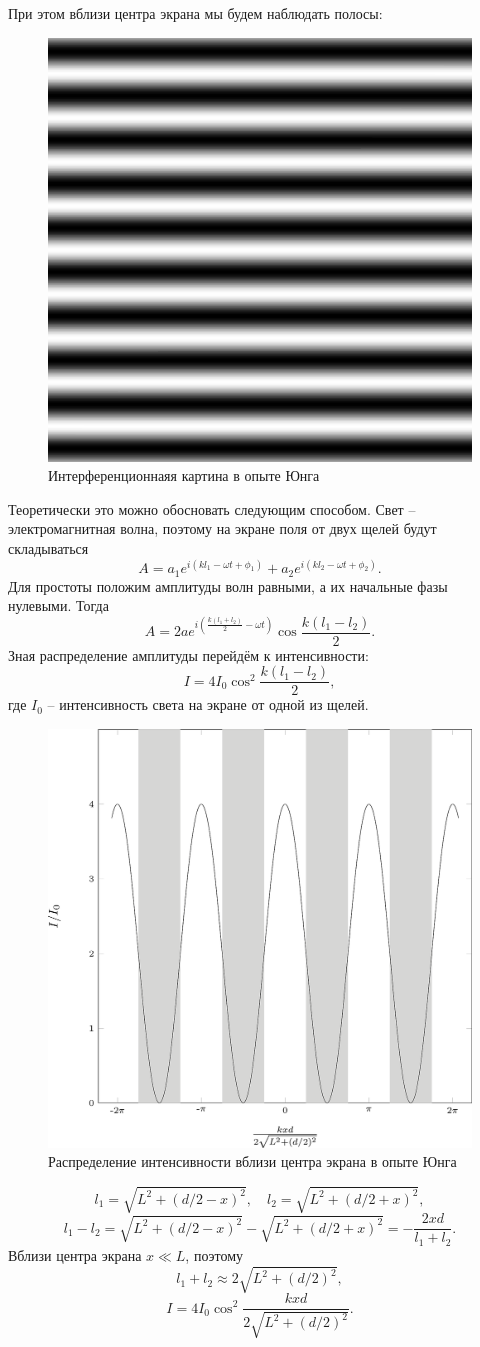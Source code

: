 \documentclass{ncc}
\begin{document}
При этом вблизи центра экрана мы будем наблюдать полосы:
\begin{figure}[h!]
\center
\includegraphics[width=.2\textwidth]{2015-10-12-difraction-young.png}
\caption{Интерференционнаяя картина в опыте Юнга}
\end{figure}

Теоретически это можно обосновать следующим способом. Свет -- электромагнитная волна, поэтому на экране поля от двух щелей будут складываться
\[
    A = a_1 e^{i(kl_1 - \omega t + \phi_1)} + a_2 e^{i(kl_2 - \omega t + \phi_2)}.
\]
Для простоты положим амплитуды волн равными, а их начальные фазы нулевыми. Тогда
\[
    A = 2a e^{i\left(\frac{k(l_1+l_2)}{2}-\omega t\right)} \cos\frac{k(l_1-l_2)}{2}.
\]
Зная распределение амплитуды перейдём к интенсивности:
\[
    I = 4I_0\cos^2\frac{k(l_1-l_2)}{2}, 
\]
где \( I_0 \) -- интенсивность света на экране от одной из щелей.
\begin{figure}[h!]
    \center
    \includegraphics[width=.7\textwidth]{2015-10-12-difraction-inter.png}
    \caption{Распределение интенсивности вблизи центра экрана в опыте Юнга}
\end{figure}
\[
    l_1 = \sqrt{L^2 + (d/2 - x)^2},\quad l_2 = \sqrt{L^2 + (d/2 + x)^2},
\]
\[
    l_1 - l_2 = \sqrt{L^2 + (d/2 - x)^2} - \sqrt{L^2 + (d/2 + x)^2} = -\frac{2xd}{l_1 + l_2}.
\]
Вблизи центра экрана \( x \ll L \), поэтому
\[
    l_1 + l_2 \approx 2\sqrt{L^2 + (d/2)^2},
\]
\[
    I = 4I_0\cos^2\frac{kxd}{2\sqrt{L^2 + (d/2)^2}}. 
\]
\end{document}
